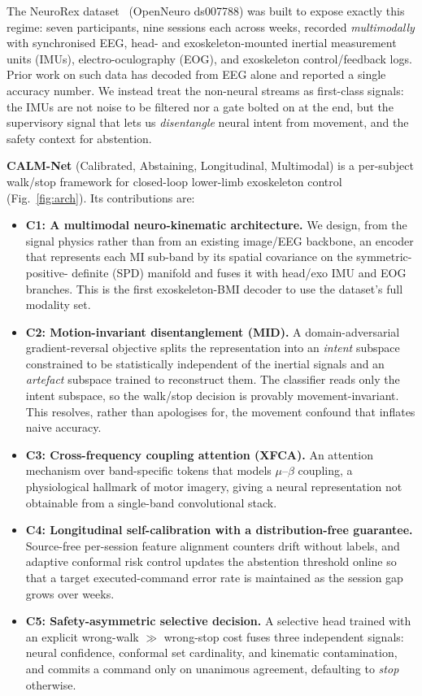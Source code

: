 \documentclass[conference]{IEEEtran}
\begin{document}
The NeuroRex dataset~\cite{sarkar2026} (OpenNeuro ds007788) was built to expose
exactly this regime: seven participants, nine sessions each across weeks, recorded
\emph{multimodally} with synchronised EEG, head- and exoskeleton-mounted inertial
measurement units (IMUs), electro-oculography (EOG), and exoskeleton control/feedback
logs. Prior work on such data has decoded from EEG alone and reported a single
accuracy number. We instead treat the non-neural streams as first-class signals: the
IMUs are not noise to be filtered nor a gate bolted on at the end, but the supervisory
signal that lets us \emph{disentangle} neural intent from movement, and the safety
context for abstention.

\textbf{CALM-Net} (Calibrated, Abstaining, Longitudinal, Multimodal) is a per-subject
walk/stop framework for closed-loop lower-limb exoskeleton control
(Fig.~\ref{fig:arch}). Its contributions are:
\begin{itemize}
\item \textbf{C1: A multimodal neuro-kinematic architecture.} We design, from the
signal physics rather than from an existing image/EEG backbone, an encoder that
represents each MI sub-band by its spatial covariance on the symmetric-positive-
definite (SPD) manifold and fuses it with head/exo IMU and EOG branches. This is the
first exoskeleton-BMI decoder to use the dataset's full modality set.
\item \textbf{C2: Motion-invariant disentanglement (MID).} A domain-adversarial
gradient-reversal objective splits the representation into an \emph{intent} subspace
constrained to be statistically independent of the inertial signals and an
\emph{artefact} subspace trained to reconstruct them. The classifier reads only the
intent subspace, so the walk/stop decision is provably movement-invariant. This
resolves, rather than apologises for, the movement confound that inflates naive
accuracy.
\item \textbf{C3: Cross-frequency coupling attention (XFCA).} An attention
mechanism over band-specific tokens that models $\mu$--$\beta$ coupling, a
physiological hallmark of motor imagery, giving a neural representation not obtainable
from a single-band convolutional stack.
\item \textbf{C4: Longitudinal self-calibration with a distribution-free
guarantee.} Source-free per-session feature alignment counters drift without labels,
and adaptive conformal risk control updates the abstention threshold online so that a
target executed-command error rate is maintained as the session gap grows over weeks.
\item \textbf{C5: Safety-asymmetric selective decision.} A selective head trained
with an explicit wrong-walk $\gg$ wrong-stop cost fuses three independent signals: 
neural confidence, conformal set cardinality, and kinematic contamination, and
commits a command only on unanimous agreement, defaulting to \emph{stop} otherwise.
\end{itemize}
\end{document}
